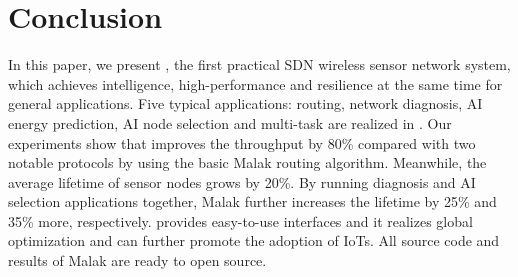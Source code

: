 \section{Conclusion}
\label{Con}

In this paper, we present {\sdn}, the first practical SDN 
wireless sensor network system,
which achieves intelligence, high-performance and 
resilience at the same time for general applications. 
Five typical applications: routing, network diagnosis, AI energy prediction, 
AI node selection and multi-task are realized in {\sdn}.
%
Our experiments show that {\sdn} 
improves the throughput by 80\% compared with two notable protocols by using the basic Malak routing algorithm. Meanwhile, the average lifetime of sensor nodes grows by 20\%. By running diagnosis and AI selection applications together, Malak further increases the lifetime by 25\% and 35\% more, respectively.
%
{\sdn} provides easy-to-use interfaces 
and it realizes global optimization and 
can further promote the adoption of IoTs.
All source code and results of Malak are ready to open source.

